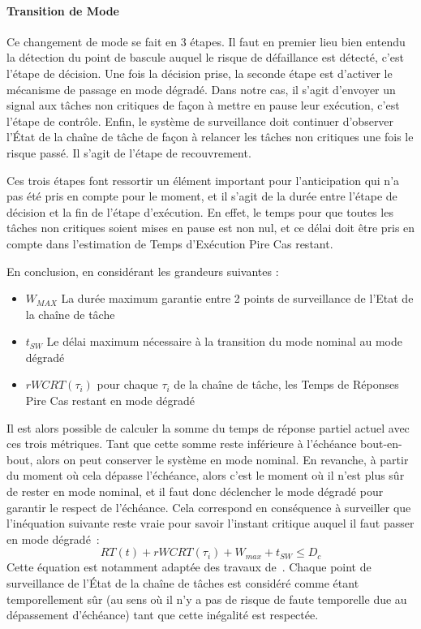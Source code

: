 \documentclass[french, a4paper, 11pt, twoside, pdftex]{StyleThese}
\begin{document}
	\paragraph{Transition de Mode}
    Ce changement de mode se fait en 3 étapes. Il faut en premier lieu bien entendu la détection du point de bascule auquel le risque de défaillance est détecté, c'est l'étape de décision. Une fois la décision prise, la seconde étape est d'activer le mécanisme de passage en mode dégradé. Dans notre cas, il s'agit d'envoyer un signal aux tâches non critiques de façon à mettre en pause leur exécution, c'est l'étape de contrôle. Enfin, le système de surveillance doit continuer d'observer l'État de la chaîne de tâche de façon à relancer les tâches non critiques une fois le risque passé. Il s'agit de l'étape de recouvrement.
    
    Ces trois étapes font ressortir un élément important pour l'anticipation qui n'a pas été pris en compte pour le moment, et il s'agit de la durée entre l'étape de décision et la fin de l'étape d'exécution. En effet, le temps pour que toutes les tâches non critiques soient mises en pause est non nul, et ce délai doit être pris en compte dans l'estimation de Temps d'Exécution Pire Cas restant. %
    
	En conclusion, en considérant les grandeurs suivantes : 
	\begin{itemize}
		\item 	$ W_{MAX} $ La durée maximum garantie entre 2 points de surveillance de l'Etat de la chaîne de tâche
		\item 	$ t_{SW} $ Le délai maximum nécessaire à la transition du mode nominal au mode dégradé
		\item 	$ rWCRT(\tau_i) $ pour chaque $\tau_i$ de la chaîne de tâche, les Temps de Réponses Pire Cas restant en mode dégradé
	\end{itemize}
	Il est alors possible de calculer la somme du temps de réponse partiel actuel avec ces trois métriques. Tant que cette somme reste inférieure à l'échéance bout-en-bout, alors on peut conserver le système en mode nominal. En revanche, à partir du moment où cela dépasse l'échéance, alors c'est le moment où il n'est plus sûr de rester en mode nominal, et il faut donc déclencher le mode dégradé pour garantir le respect de l'échéance. Cela correspond en conséquence à surveiller que l'inéquation suivante reste vraie pour savoir l'instant critique auquel il faut passer en mode dégradé~:
	\begin{equation} \label{eq:safe_cond}
		RT(t) + rWCRT(\tau_i) + W_{max} + t_{SW} \leq D_c
	\end{equation} 
	Cette équation est notamment adaptée des travaux de~\cite{kritikakou_run-time_2014}. Chaque point de surveillance de l'État de la chaîne de tâches est considéré comme étant temporellement sûr (au sens où il n'y a pas de risque de faute temporelle due au dépassement d'échéance) tant que cette inégalité est respectée.
    
\end{document}

